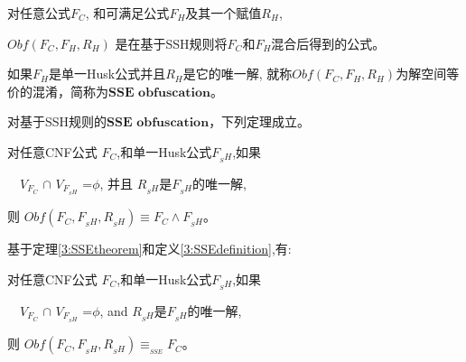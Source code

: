 \begin{definition}\label{3:OBFUSCATORSSH}
对任意公式$F_C$, 和可满足公式$F_H$及其一个赋值$R_H$,

$Obf(F_C,F_H,R_H)$ 是在基于SSH规则将$F_C$和$F_H$混合后得到的公式。

如果$F_H$是单一Husk公式并且$R_H$是它的唯一解,
就称$Obf(F_C,F_H,R_H)$为解空间等价的混淆，简称为${\textbf{SSE obfuscation}}$。

\end{definition}

对基于SSH规则的${\textbf{SSE obfuscation}}$，下列定理成立。

\begin{theorem}\label{3:SSEtheorem}

对任意CNF公式 $F_C$,和单一Husk公式$F_{_SH}$,如果

~~$V_{F_C}$ $\cap$ $V_{F_{_SH}}$ =$\phi$, 并且
$R_{_SH}$是$F_{_SH}$的唯一解,

则 $Obf(F_C,F_{_SH},R_{_SH}) \equiv F_C\wedge F_{_SH}$。
\end{theorem}

基于定理\ref{3:SSEtheorem}和定义\ref{3:SSEdefinition},有:
\begin{theorem}\label{3:SSEinference}
对任意CNF公式 $F_C$,和单一Husk公式$F_{_SH}$,如果

~~$V_{F_C}$ $\cap$ $V_{F_{_SH}}$ =$\phi$, and
$R_{_SH}$是$F_{_SH}$的唯一解,

则 $Obf(F_C,F_{_SH},R_{_SH}) \equiv_{_{SSE}} F_C$。
\end{theorem}


